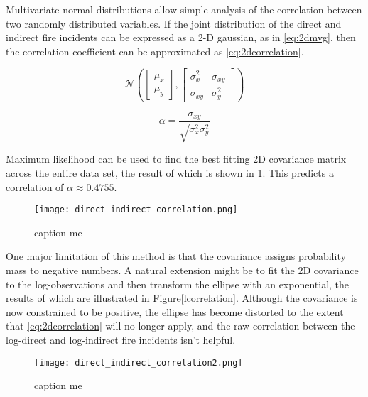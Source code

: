 \documentclass[a4paper,11pt]{report}
\begin{document}
Multivariate normal distributions allow simple analysis of the correlation between two randomly distributed variables. If the joint distribution of the direct and indirect fire incidents can be expressed as a 2-D gaussian, as in \ref{eq:2dmvg}, then the correlation coefficient can be approximated as \ref{eq:2dcorrelation}.

\begin{equation} \label{eq:2dmvg}
\mathcal{N} \left( \left[ \begin{array}{cc}
\mu_x \\
\mu_y \end{array} \right], \left[ \begin{array}{cc}
\sigma_{x}^2 & \sigma_{xy} \\
\sigma_{xy} & \sigma_{y}^2  \end{array} \right] \right)
\end{equation}

\begin{equation} \label{eq:2dcorrelation}
\alpha = \frac{\sigma_{xy}}{\sqrt{\sigma_{x}^2 \sigma_{y}^2}}
\end{equation}

Maximum likelihood can be used to find the best fitting 2D covariance matrix across the entire data set, the result of which is shown in \ref{fig:correlation}. This predicts a correlation of \(\alpha \approx 0.4755\).

\begin{figure}
\centering
\texttt{[image: direct\_indirect\_correlation.png]}
\caption{caption me}
\label{fig:correlation}
\end{figure}


One major limitation of this method is that the covariance assigns probability mass to negative numbers. A natural extension might be to fit the 2D covariance to the log-observations and then transform the ellipse with an exponential, the results of which are illustrated in Figure\ref{lcorrelation}. Although the covariance is now constrained to be positive, the ellipse has become distorted to the extent that \ref{eq:2dcorrelation} will no longer apply, and the raw correlation between the log-direct and log-indirect fire incidents isn't helpful.

\begin{figure}
\centering
\texttt{[image: direct\_indirect\_correlation2.png]}
\caption{caption me}
\label{fig:lcorrelation}
\end{figure}
\end{document}
